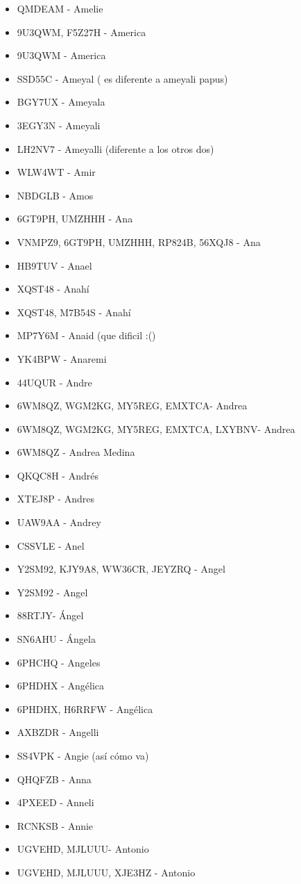 \begin{itemize}[leftmargin=*,nosep]
\item QMDEAM - Amelie
\item 9U3QWM, F5Z27H - America
\item 9U3QWM - America
\item SSD55C - Ameyal ( es diferente a ameyali papus)
\item BGY7UX - Ameyala
\item 3EGY3N - Ameyali
\item LH2NV7 - Ameyalli (diferente a los otros dos)
\item WLW4WT - Amir
\item NBDGLB - Amos
\item 6GT9PH, UMZHHH - Ana
\item VNMPZ9, 6GT9PH, UMZHHH, RP824B, 56XQJ8 - Ana
\item HB9TUV - Anael
\item XQST48 - Anahí
\item XQST48, M7B54S - Anahí
\item MP7Y6M - Anaid (que dificil :()
\item YK4BPW - Anaremi
\item 44UQUR - Andre
\item 6WM8QZ, WGM2KG, MY5REG, EMXTCA- Andrea
\item 6WM8QZ, WGM2KG, MY5REG, EMXTCA, LXYBNV- Andrea
\item 6WM8QZ - Andrea Medina
\item QKQC8H - Andrés
\item XTEJ8P - Andres
\item UAW9AA - Andrey
\item CSSVLE - Anel
\item Y2SM92, KJY9A8, WW36CR, JEYZRQ - Angel
\item Y2SM92 - Angel
\item 88RTJY- Ángel
\item SN6AHU - Ángela
\item 6PHCHQ - Angeles
\item 6PHDHX - Angélica
\item 6PHDHX, H6RRFW - Angélica
\item AXBZDR - Angelli
\item SS4VPK - Angie (así cómo va)
\item QHQFZB - Anna
\item 4PXEED - Anneli
\item RCNKSB - Annie
\item UGVEHD, MJLUUU- Antonio
\item UGVEHD, MJLUUU, XJE3HZ - Antonio

\end{itemize}
